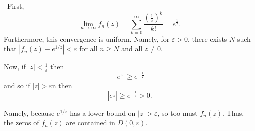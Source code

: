 \documentclass[12pt]{Homework}
\begin{document}
\begin{solution}$\,$
First, $$\lim_{n\to\infty}f_n(z)=\sum_{k=0}^\infty\frac{\left(\frac{1}{z}\right)^k}{k!}=e^\frac{1}{z}.$$ Furthermore, this convergence is uniform. Namely, for $\varepsilon>0$, there exists $N$ such that $|f_n(z)-e^{1/z}|<\varepsilon$ for all $n\ge N$ and all $z\not=0.$

Now, if $|z|<\frac{1}{\varepsilon}$ then $$|e^z|\ge e^{-\frac{1}{\varepsilon}}$$ and so if $|z|>\varepsilon$n then $$|e^{\frac{1}{z}}|\ge e^{-\frac{1}{\varepsilon}}>0.$$

Namely, because $e^{1/z}$ has a lower bound on $|z|>\varepsilon$, so too must $f_n(z)$. Thus, the zeros of $f_n(z)$ are contained in $D(0,\varepsilon).$
\end{solution}
\end{document}
